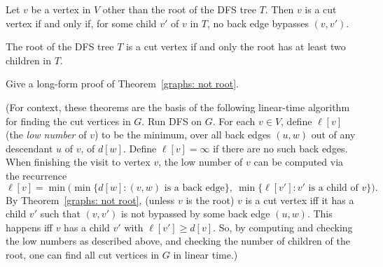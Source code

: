 \documentclass[11pt]{article}
\begin{document}
\begin{theorem}\label{graphs: not root}
  Let $v$ be a vertex in $V$ other than the root of the DFS tree $T$.
  Then $v$ is a cut vertex
  if and only if, for some child $v'$ of $v$ in $T$, no back edge bypasses $(v, v')$.
\end{theorem}

\begin{theorem}\label{graphs: root}
  The root of the DFS tree $T$ is a cut vertex if and only the root has at least two children in $T$.
\end{theorem}

Give a long-form proof of Theorem~\ref{graphs: not root}.

(For context, these theorems are the basis
of the following linear-time algorithm for finding the cut vertices in $G$.
Run DFS on $G$.
For each $v\in V$,
define $\ell[v]$ (the \emph{low number} of $v$)
to be the minimum,
over all back edges $(u,w)$ out of any descendant $u$ of $v$,
of $d[w]$.
Define $\ell[v]=\infty$ if there are no such back edges.
When finishing the visit to vertex $v$,
the low number of $v$ can be computed via the recurrence
\[\ell[v] = \min\big(\min\{d[w] : (v,w) \text{ is a back edge}\},
  ~\min \{ \ell[v'] : v' \text{ is a child of } v\}\big).\]
By Theorem~\ref{graphs: not root}, (unless $v$ is the root)
$v$ is a cut vertex iff it has a child $v'$ such that $(v,v')$
is not bypassed by some back edge $(u,w)$.
This happens iff $v$ has a child $v'$ with $\ell[v'] \ge d[v]$.
So, by computing and checking the low numbers
as described above, and checking the number of children of the root,
one can find all cut vertices in $G$ in linear time.)


\noindent
{}
\end{document}
